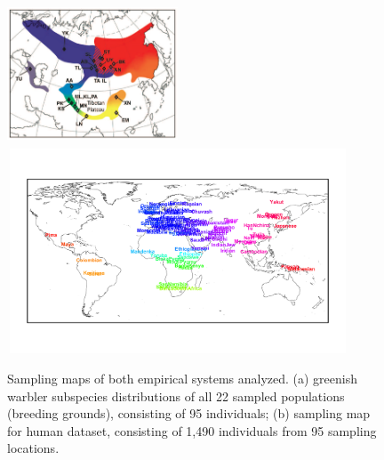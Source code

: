 \documentclass[12pt]{article}
\begin{document}
\begin{figure}
	\centering
			{\includegraphics[width=2in,height=1.66in]{figs/warblers/Irwin_warbler_map_figure.png}}
			{\includegraphics[width=4in,height=2.4in]{figs/globetrotter/globe_world_map_text.png}}
            \caption{Sampling maps of both empirical systems analyzed.  (a) greenish warbler subspecies distributions of all 22 sampled populations (breeding grounds), consisting of 95 individuals; (b) sampling map for human dataset, consisting of 1,490 individuals from 95 sampling locations.}
\label{sfig:empirical_maps}
\end{figure}
\end{document}
